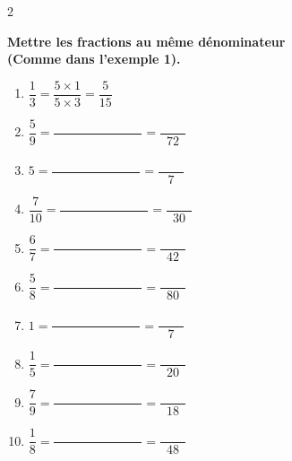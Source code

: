 \documentclass[10pt]{article}
\begin{document}
\renewcommand{\centerhead}{Fractions -  Devoir Bilan}

\renewcommand{\baselinestretch}{1}
\setlength{\parindent}{0pt}


\begin{center}
    
\end{center}
\begin{multicols}{2}
  \begin{exercicedevoir}[5]
    \textbf{Mettre les fractions au même dénominateur \\(Comme dans
    l'exemple 1).}
    \begin{enumerate}
    \item $\dfrac{1}{3} = \dfrac{5 \times 1}{5 \times 3}
      = $$\dfrac{5}{15}$
    \item $\dfrac{5}{9} =
      \dfrac{\phantom{00000000000000}}{\phantom{00000000000000}}
      = $$\dfrac{\phantom{0000}}{72}$
    \item $5 =
      \dfrac{\phantom{00000000000000}}{\phantom{00000000000000}} =
      \dfrac{\phantom{0000}}{7}$
    \item $\dfrac{7}{10} =
      \dfrac{\phantom{00000000000000}}{\phantom{00000000000000}}
      = $$\dfrac{\phantom{0000}}{30}$
    \item $\dfrac{6}{7} =
      \dfrac{\phantom{00000000000000}}{\phantom{00000000000000}}
      = $$\dfrac{\phantom{0000}}{42}$
    \item $\dfrac{5}{8} =
      \dfrac{\phantom{00000000000000}}{\phantom{00000000000000}}
      = $$\dfrac{\phantom{0000}}{80}$
    \item $1 =
      \dfrac{\phantom{00000000000000}}{\phantom{00000000000000}} =
      \dfrac{\phantom{0000}}{7}$
    \item $\dfrac{1}{5} =
      \dfrac{\phantom{00000000000000}}{\phantom{00000000000000}}
      = $$\dfrac{\phantom{0000}}{20}$
    \item $\dfrac{7}{9} =
      \dfrac{\phantom{00000000000000}}{\phantom{00000000000000}}
      = $$\dfrac{\phantom{0000}}{18}$
    \item $\dfrac{1}{8} =
      \dfrac{\phantom{00000000000000}}{\phantom{00000000000000}}
      = $$\dfrac{\phantom{0000}}{48}$
    \end{enumerate}
  \end{exercicedevoir}
\vspace{-2cm}

\end{multicols}
\end{document}
